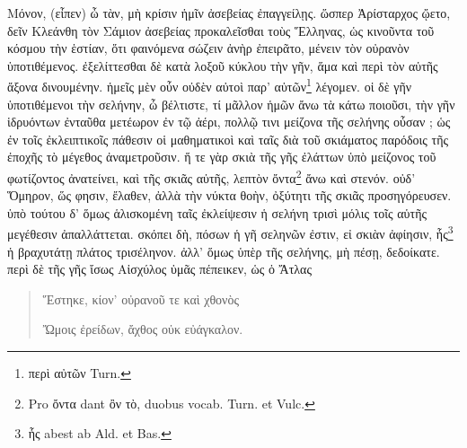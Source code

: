 \documentclass[a4paper, 11pt, oneside, polutonikogreek, german]{article}
\begin{document}
Μόνον, (εἶπεν) ὦ τὰν, μὴ κρίσιν ἡμῖν ἀσεβείας ἐπαγγείλῃς. ὥσπερ Ἀρίσταρχος ᾤετο, δεῖν Κλεάνθη τὸν Σάμιον ἀσεβείας προκαλεῖσθαι τοὺς Ἕλληνας, ὡς κινοῦντα τοῦ κόσμου τὴν ἑστίαν, ὅτι φαινόμενα σώζειν ἀνὴρ ἐπειρᾶτο, μένειν τὸν οὐρανὸν ὑποτιθέμενος. ἐξελίττεσθαι δὲ κατὰ λοξοῦ κύκλου τὴν γῆν, ἅμα καὶ περὶ τὸν αὑτῆς ἄξονα δινουμένην. ἡμεῖς μὲν οὖν οὐδὲν αὐτοὶ παρ' αὑτῶν\footnote{περὶ αὐτῶν Turn.} λέγομεν. οἱ δὲ γῆν ὑποτιθέμενοι τὴν σελήνην, ὦ βέλτιστε, τί μᾶλλον ἡμῶν ἄνω τὰ κάτω ποιοῦσι, τὴν γῆν ἱδρυόντων ἐνταῦθα μετέωρον ἐν τῷ ἀέρι, πολλῷ τινι μείζονα τῆς σελήνης οὖσαν ; ὡς ἐν τοῖς ἐκλειπτικοῖς πάθεσιν οἱ μαθηματικοὶ καὶ ταῖς διὰ τοῦ σκιάματος παρόδοις τῆς ἐποχῆς τὸ μέγεθος ἀναμετροῦσιν. ἥ τε γὰρ σκιὰ τῆς γῆς ἐλάττων ὑπὸ μείζονος τοῦ φωτίζοντος ἀνατείνει, καὶ τῆς σκιᾶς αὐτῆς, λεπτὸν ὄντα\footnote{Pro ὄντα dant ὂν τὸ, duobus vocab. Turn. et Vulc.} ἄνω καὶ στενόν. οὐδ' Ὅμηρον, ὥς φησιν, ἔλαθεν, ἀλλὰ τὴν νύκτα θοὴν, ὀξύτητι τῆς σκιᾶς προσηγόρευσεν. ὑπὸ τούτου δ' ὅμως ἁλισκομένη ταῖς ἐκλείψεσιν ἡ σελήνη τρισὶ μόλις τοῖς αὑτῆς μεγέθεσιν ἀπαλλάττεται. σκόπει δὴ, πόσων ἡ γῆ σεληνῶν ἐστιν, εἰ σκιὰν ἀφίησιν, ἧς\footnote{ἧς abest ab Ald. et Bas.} ἡ βραχυτάτῃ πλάτος τρισέληνον. ἀλλ' ὅμως ὑπὲρ τῆς σελήνης, μὴ πέσῃ, δεδοίκατε. περὶ δὲ τῆς γῆς ἴσως Αἰσχύλος ὑμᾶς πέπεικεν, ὡς ὁ Ἄτλας
\begin{quotation}
Ἕστηκε, κίον' οὐρανοῦ τε καὶ χθονὸς

Ὤμοις ἐρείδων, ἄχθος οὐκ εὐάγκαλον.
\end{quotation}
\end{document}
